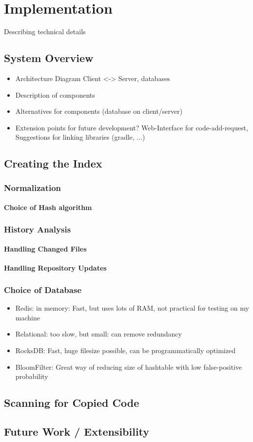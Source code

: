
\chapter{Implementation}\label{chapter:implementation}
Describing technical details %
\section{System Overview}
\begin{itemize}
    \item Architecture Diagram Client <-> Server, databases
    \item Description of components
    \item Alternatives for components (database on client/server)
    \item Extension points for future development? Web-Interface for code-add-request, Suggestions for linking libraries (gradle, ...)
\end{itemize}
\section{Creating the Index}
\subsection{Normalization}
\subsubsection{Choice of Hash algorithm}
\subsection{History Analysis}
\subsubsection{Handling Changed Files}
\subsubsection{Handling Repository Updates}
\subsection{Choice of Database}
\begin{itemize}
    \item Redis: in memory: Fast, but uses lots of RAM, not practical for testing on my machine
    \item Relational: too slow, but small: can remove redundancy
    \item RocksDB: Fast, huge filesize possible, can be programmatically optimized
    \item BloomFilter: Great way of reducing size of hashtable with low false-positive probability
\end{itemize}
\section{Scanning for Copied Code}
\section{Future Work / Extensibility}
